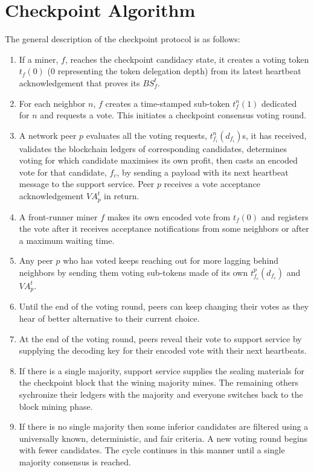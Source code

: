 \documentclass[conference]{IEEEtran}
\begin{document}


    



\section{Checkpoint Algorithm}
\label{s-algorithm}
The general description of the checkpoint protocol is as follows:
\begin{enumerate}
\item If a miner, $f$, reaches the checkpoint candidacy state, it creates a voting token $t_f(0)$ (0 representing the token delegation depth) from its latest heartbeat acknowledgement that proves its  $BS_f^t$.
\item For each neighbor $n$, $f$ creates a time-stamped sub-token $t_f^{n}(1)$ dedicated for $n$ and requests a vote. This initiates a checkpoint consensus voting round.
\item A network peer $p$ evaluates all the voting requests, $t_{f_i}^{n}(d_{f_i})$s, it has received, validates the blockchain ledgers of corresponding candidates, determines voting for which candidate maximises its own profit, then casts an encoded vote for that candidate, $f_c$, by sending a payload with its next heartbeat message to the support service. Peer $p$ receives a vote acceptance acknowledgement $VA_p^t$ in return.
\item A front-runner miner $f$ makes its own encoded vote from $t_f(0)$ and registers the vote after it receives acceptance notifications from some neighbors or after a maximum waiting time.
\item Any peer $p$ who has voted keeps reaching out for more lagging behind neighbors by sending them voting sub-tokens made of its own $t_{f_c}^{p}(d_{f_c})$ and $VA_p^t$.
\item Until the end of the voting round, peers can keep changing their votes as they hear of better alternative to their current choice.   
\item At the end of the voting round, peers reveal their vote to support service by supplying the decoding key for their encoded vote with their next heartbeats.
\item If there is a single majority, support service supplies the sealing materials for the checkpoint block that the wining majority mines. The remaining others sychronize their ledgers with the majority and everyone switches back to the block mining phase.
\item If there is no single majority then some inferior candidates are filtered using a universally known, deterministic, and fair criteria. A new voting round begins with fewer candidates. The cycle continues in this manner until a single majority consensus is reached.                              
\end{enumerate}
\end{document}
